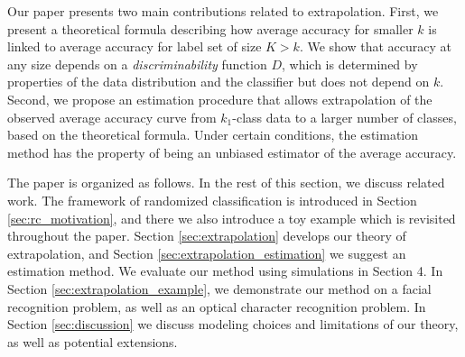 \documentclass[twoside,11pt]{article}
\begin{document}

Our paper presents two main contributions related to extrapolation.
First, we present a theoretical formula describing how average accuracy
for smaller $k$ is linked to average accuracy for label set of size
$K>k$.  We show that accuracy at any size depends on a
\emph{discriminability} function ${D}$, which is determined by properties
of the data distribution and the classifier but does not depend on $k$.  Second, we propose an
estimation procedure that allows extrapolation of the observed average
accuracy curve from $k_1$-class data to a larger number of classes,
based on the theoretical formula. Under certain conditions, the
estimation method has the property of being an unbiased estimator of
the average accuracy.

The paper is organized as follows.  In the rest of this section, we
discuss related work.  The framework of randomized classification is
introduced in Section \ref{sec:rc_motivation}, and there we also
introduce a toy example which is revisited throughout the
paper. Section \ref{sec:extrapolation} develops our theory of
extrapolation, and Section \ref{sec:extrapolation_estimation} we
suggest an estimation method. We evaluate our method using simulations in Section 4.
In Section
\ref{sec:extrapolation_example}, we demonstrate our method on a facial
recognition problem, as well as an optical character recognition problem. In Section \ref{sec:discussion} we
discuss modeling choices and limitations of our theory, as well as
potential extensions.
\end{document}
